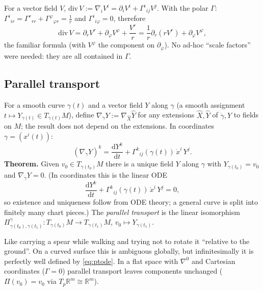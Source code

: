 \documentclass[11pt,a4paper]{article}
\numberwithin{equation}{section}
\theoremstyle{definition}
\theoremstyle{plain}
\newcommand{\R}{\mathbb{R}}
\newcommand{\dd}{\mathrm{d}}
\begin{document}
\begin{example}
For a vector field $V$, $\mathrm{div}\,V:=\nabla_iV^i=\partial_iV^i+\Gamma^i{}_{ij}V^j$. With the polar $\Gamma$: $\Gamma^i{}_{ir}=\Gamma^r{}_{rr}+\Gamma^\varphi{}_{\varphi r}=\frac1r$ and $\Gamma^i{}_{i\varphi}=0$, therefore
\[
\mathrm{div}\,V=\partial_rV^r+\partial_\varphi V^\varphi+\frac{V^r}{r}=\frac1r\partial_r(rV^r)+\partial_\varphi V^\varphi ,
\]
the familiar formula (with $V^\varphi$ the component on $\partial_\varphi$). No ad-hoc ``scale factors'' were needed: they are all contained in $\Gamma$.
\end{example}

\subsection{Parallel transport}
\begin{formal}
For a smooth curve $\gamma(t)$ and a vector field $Y$ along $\gamma$ (a smooth assignment $t\mapsto Y_{\gamma(t)}\in T_{\gamma(t)}M$), define $\nabla_{\dot\gamma}Y:=\nabla_{\hat X}\hat Y$ for any extensions $\hat X,\hat Y$ of $\dot\gamma, Y$ to fields on $M$; the result does not depend on the extensions. In coordinates $\gamma=(x^i(t))$:
\[
(\nabla_{\dot\gamma}Y)^k=\frac{\dd Y^k}{\dd t}+\Gamma^k{}_{ij}(\gamma(t))\,\dot x^i\,Y^j .
\]
\textbf{Theorem.} Given $v_0\in T_{\gamma(t_0)}M$ there is a unique field $Y$ along $\gamma$ with $Y_{\gamma(t_0)}=v_0$ and $\nabla_{\dot\gamma}Y=0$. (In coordinates this is the linear ODE
\begin{equation}\label{eq:ptode}
\frac{\dd Y^k}{\dd t}+\Gamma^k{}_{ij}(\gamma(t))\,\dot x^i\,Y^j=0,
\end{equation}
so existence and uniqueness follow from ODE theory; a general curve is split into finitely many chart pieces.) The \emph{parallel transport} is the linear isomorphism $\Pi^\gamma_{\gamma(t_0),\gamma(t_1)}:T_{\gamma(t_0)}M\to T_{\gamma(t_1)}M$, $v_0\mapsto Y_{\gamma(t_1)}$.
\end{formal}
\begin{intuition}
Like carrying a spear while walking and trying not to rotate it ``relative to the ground''. On a curved surface this is ambiguous globally, but infinitesimally it is perfectly well defined by \eqref{eq:ptode}. In a flat space with $\nabla^0$ and Cartesian coordinates ($\Gamma=0$) parallel transport leaves components unchanged ($\Pi(v_0)=v_0$ via $T_p\R^m\cong\R^m$).
\end{intuition}
\end{document}
